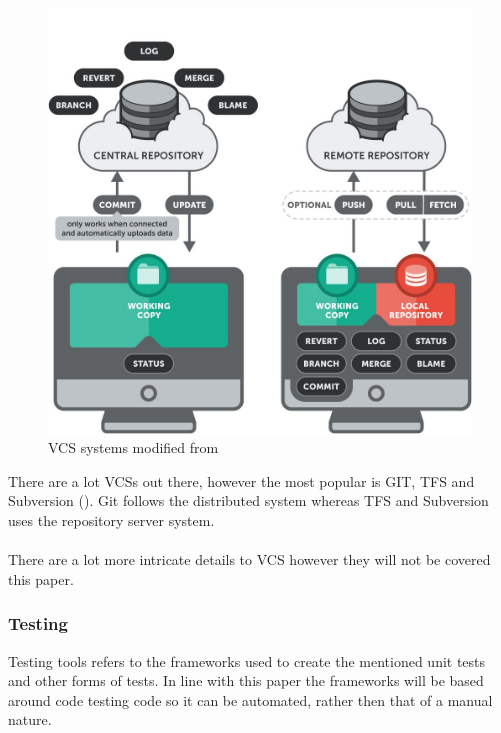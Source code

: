 \begin{figure}[H]
	\centering
	\includegraphics[scale=0.30]{images/systems.jpg}
	\caption{VCS systems modified from \cite{VCSSYSTEMS}}
	\label{fig:vcs_systems}
\end{figure}

There are a lot VCSs out there, however the most popular is GIT, TFS and Subversion (\cite{vcspop}). Git follows the distributed system whereas TFS and Subversion uses the repository server system.
\\\\
There are a lot more intricate details to VCS however they will not be covered this paper.

\subsubsection{Testing}

Testing tools refers to the frameworks used to create the mentioned unit tests and other forms of tests. In line with this paper the frameworks will be based around code testing code so it can be automated, rather then that of a manual nature.

